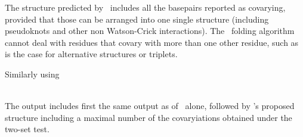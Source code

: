 The structure predicted by \rscape\ includes all the basepairs
reported as covarying, provided that those can be arranged into one
single structure (including pseudoknots and other non Watson-Crick
interactions). The \rscape\ folding algorithm cannot deal with
residues that covary with more than one other residue, such as is the case for
alternative structures or triplets.

\noindent
Similarly using

\\

\noindent
The output includes first the same output as  of
\rscape\ alone, followed by \rscape's proposed structure including a
maximal number of the covaryiations obtained under the two-set test.


